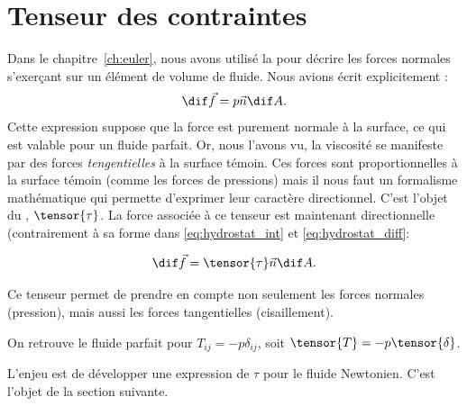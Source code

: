 \section{Tenseur des contraintes}

Dans le chapitre~\ref{ch:euler}, nous avons utilisé la  pour décrire les forces normales s'exerçant sur un élément de volume de fluide. Nous avions écrit explicitement :
\begin{displaymath}
  \dif\vec{f} = p \vec{n} \dif A.
\end{displaymath}
Cette expression suppose que la force est purement normale à la surface, ce qui est valable pour un fluide parfait.
Or, nous l'avons vu, la viscosité se manifeste par des forces \emph{tengentielles} à la surface témoin. Ces forces sont proportionnelles à la surface témoin (comme les forces de pressions) mais il nous faut un formalisme mathématique qui permette d'exprimer leur caractère directionnel. C'est l'objet du , $\tensor{\tau}$. La force associée à ce tenseur est maintenant directionnelle (contrairement à sa forme dans \eqref{eq:hydrostat_int} et \eqref{eq:hydrostat_diff}:


\begin{displaymath}
  \dif\vec{f} = \tensor{\tau} \vec{n} \dif A.
\end{displaymath}

Ce tenseur permet de prendre en compte non seulement les forces normales (pression), mais aussi les forces tangentielles (cisaillement). 

On retrouve le fluide parfait pour  $T_{ij} = -p \delta_{ij}$, soit $\tensor{T} = -p \tensor{\delta}$.


L'enjeu est de développer une expression de $\tau$ pour le fluide Newtonien. C'est l'objet de la section suivante. 

